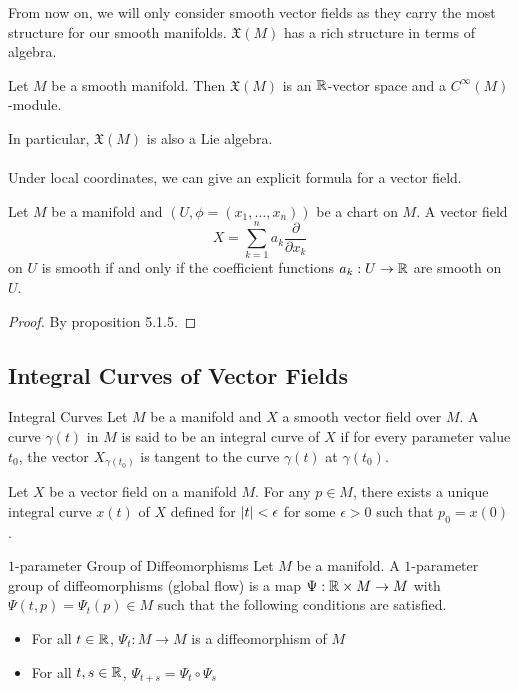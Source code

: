 \documentclass[a4paper]{article}
\begin{document}
From now on, we will only consider smooth vector fields as they carry the most structure for our smooth manifolds. $\mathfrak{X}(M)$ has a rich structure in terms of algebra. 

\begin{prp}{}{} Let $M$ be a smooth manifold. Then $\mathfrak{X}(M)$ is an $\mathbb{R}$-vector space and a $C^\infty(M)$-module. 
\end{prp}

In particular, $\mathfrak{X}(M)$ is also a Lie algebra. \\~\\

Under local coordinates, we can give an explicit formula for a vector field. 

\begin{prp}{}{} Let $M$ be a manifold and $(U,\phi=(x_1,\dots,x_n))$ be a chart on $M$. A vector field $$X=\sum_{k=1}^na_k\frac{\partial}{\partial x_k}$$ on $U$ is smooth if and only if the coefficient functions $a_k:U\to\mathbb{R}$ are smooth on $U$. \tcbline
\begin{proof}
By proposition 5.1.5. 
\end{proof}
\end{prp}

\subsection{Integral Curves of Vector Fields}
\begin{defn}{Integral Curves}{} Let $M$ be a manifold and $X$ a smooth vector field over $M$. A curve $\gamma(t)$ in $M$ is said to be an integral curve of $X$ if for every parameter value $t_0$, the vector $X_{\gamma(t_0)}$ is tangent to the curve $\gamma(t)$ at $\gamma(t_0)$. 
\end{defn}

\begin{prp}{}{} Let $X$ be a vector field on a manifold $M$. For any $p\in M$, there exists a unique integral curve $x(t)$ of $X$ defined for $\abs{t}<\epsilon$ for some $\epsilon>0$ such that $p_0=x(0)$. 
\end{prp}

\begin{defn}{$1$-parameter Group of Diffeomorphisms}{} Let $M$ be a manifold. A $1$-parameter group of diffeomorphisms (global flow) is a map $\Psi:\mathbb{R}\times M\to M$ with $\Psi(t,p)=\Psi_t(p)\in M$ such that the following conditions are satisfied. 
\begin{itemize}
\item For all $t\in\mathbb{R}$, $\Psi_t:M\to M$ is a diffeomorphism of $M$
\item For all $t,s\in\mathbb{R}$, $\Psi_{t+s}=\Psi_t\circ\Psi_s$
\end{itemize}
\end{defn}
\end{document}
